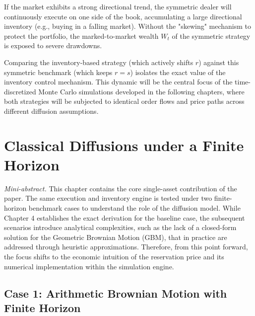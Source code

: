 \documentclass[a4paper,10pt,titlepage,oneside,openany]{book}
\theoremstyle{plain}\newtheorem{theorem}{Theorem}[chapter]
\theoremstyle{definition}\newtheorem{definition}{Definition}[chapter]
\theoremstyle{remark}\newtheorem{remark}{Remark}[chapter]
\newcommand{\miniabstract}[1]{%
\vspace{-2pt}
\begin{tcolorbox}[colback=gray!6,colframe=black!15,boxrule=0.3pt,arc=3pt,left=6pt,right=6pt,top=4pt,bottom=4pt]
\textit{Mini-abstract.} #1
\end{tcolorbox}
\vspace{-4pt}
}
\begin{document}
If the market exhibits a strong directional trend, the symmetric dealer will continuously execute on one side of the book, accumulating a large directional inventory (e.g., buying in a falling market). Without the "skewing" mechanism to protect the portfolio, the marked-to-market wealth $W_t$ of the symmetric strategy is exposed to severe drawdowns. 

Comparing the inventory-based strategy (which actively shifts $r$) against this symmetric benchmark (which keeps $r=s$) isolates the exact value of the inventory control mechanism. This dynamic will be the central focus of the time-discretized Monte Carlo simulations developed in the following chapters, where both strategies will be subjected to identical order flows and price paths across different diffusion assumptions.

\chapter{Classical Diffusions under a Finite Horizon}
\miniabstract{This chapter contains the core single-asset contribution of the paper. The same execution and inventory engine is tested under two finite-horizon benchmark cases to understand the role of the diffusion model. While Chapter 4 establishes the exact derivation for the baseline case, the subsequent scenarios introduce analytical complexities, such as the lack of a closed-form solution for the Geometric Brownian Motion (GBM), that in practice are addressed through heuristic approximations. Therefore, from this point forward, the focus shifts to the economic intuition of the reservation price and its numerical implementation within the simulation engine.}

\section{Case 1: Arithmetic Brownian Motion with Finite Horizon}
\end{document}
